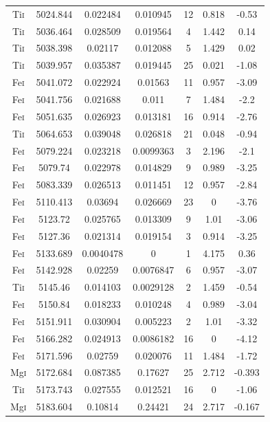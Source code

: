 \begin{longtable}{|c|c|c|c|c|c|c|}
Ti\textsc{i} & 5024.844 & 0.022484 & 0.010945 & 12 & 0.818 & -0.53 \\ 
Ti\textsc{i} & 5036.464 & 0.028509 & 0.019564 & 4 & 1.442 & 0.14 \\   
Ti\textsc{i} & 5038.398 & 0.02117 & 0.012088 & 5 & 1.429 & 0.02 \\    
Ti\textsc{i} & 5039.957 & 0.035387 & 0.019445 & 25 & 0.021 & -1.08 \\ 
Fe\textsc{i} & 5041.072 & 0.022924 & 0.01563 & 11 & 0.957 & -3.09 \\  
Fe\textsc{i} & 5041.756 & 0.021688 & 0.011 & 7 & 1.484 & -2.2 \\      
Fe\textsc{i} & 5051.635 & 0.026923 & 0.013181 & 16 & 0.914 & -2.76 \\ 
Ti\textsc{i} & 5064.653 & 0.039048 & 0.026818 & 21 & 0.048 & -0.94 \\ 
Fe\textsc{i} & 5079.224 & 0.023218 & 0.0099363 & 3 & 2.196 & -2.1 \\  
Fe\textsc{i} & 5079.74 & 0.022978 & 0.014829 & 9 & 0.989 & -3.25 \\   
Fe\textsc{i} & 5083.339 & 0.026513 & 0.011451 & 12 & 0.957 & -2.84 \\ 
Fe\textsc{i} & 5110.413 & 0.03694 & 0.026669 & 23 & 0 & -3.76 \\      
Fe\textsc{i} & 5123.72 & 0.025765 & 0.013309 & 9 & 1.01 & -3.06 \\    
Fe\textsc{i} & 5127.36 & 0.021314 & 0.019154 & 3 & 0.914 & -3.25 \\   
Fe\textsc{i} & 5133.689 & 0.0040478 & 0 & 1 & 4.175 & 0.36 \\         
Fe\textsc{i} & 5142.928 & 0.02259 & 0.0076847 & 6 & 0.957 & -3.07 \\  
Ti\textsc{i} & 5145.46 & 0.014103 & 0.0029128 & 2 & 1.459 & -0.54 \\  
Fe\textsc{i} & 5150.84 & 0.018233 & 0.010248 & 4 & 0.989 & -3.04 \\   
Fe\textsc{i} & 5151.911 & 0.030904 & 0.005223 & 2 & 1.01 & -3.32 \\   
Fe\textsc{i} & 5166.282 & 0.024913 & 0.0086182 & 16 & 0 & -4.12 \\    
Fe\textsc{i} & 5171.596 & 0.02759 & 0.020076 & 11 & 1.484 & -1.72 \\  
Mg\textsc{i} & 5172.684 & 0.087385 & 0.17627 & 25 & 2.712 & -0.393 \\ 
Ti\textsc{i} & 5173.743 & 0.027555 & 0.012521 & 16 & 0 & -1.06 \\     
Mg\textsc{i} & 5183.604 & 0.10814 & 0.24421 & 24 & 2.717 & -0.167 \\  

\end{longtable}
